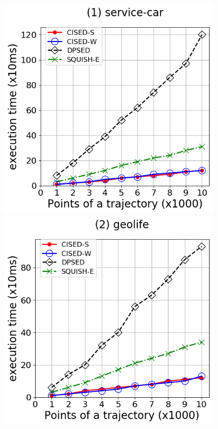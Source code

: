 \begin{figure}[tb!]
\centering
\includegraphics[scale = 0.275]{Figures/Exp-time-size-service.png}\hspace{3ex}
\includegraphics[scale = 0.275]{Figures/Exp-time-size-geolife.png}\hspace{3ex}

\end{figure}
